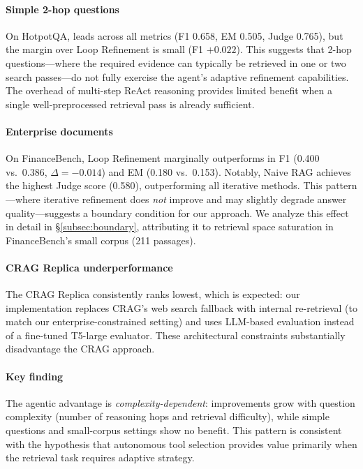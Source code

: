 \paragraph{Simple 2-hop questions}
On HotpotQA, \ours{} leads across all metrics (F1 0.658, EM 0.505, Judge 0.765), but the margin over Loop Refinement is small (F1 $+0.022$).
This suggests that 2-hop questions---where the required evidence can typically be retrieved in one or two search passes---do not fully exercise the agent's adaptive refinement capabilities.
The overhead of multi-step ReAct reasoning provides limited benefit when a single well-preprocessed retrieval pass is already sufficient.

\paragraph{Enterprise documents}
On FinanceBench, Loop Refinement marginally outperforms \ours{} in F1 (0.400 vs.\ 0.386, $\Delta = -0.014$) and EM (0.180 vs.\ 0.153).
Notably, Naive RAG achieves the highest Judge score (0.580), outperforming all iterative methods.
This pattern---where iterative refinement does \emph{not} improve and may slightly degrade answer quality---suggests a boundary condition for our approach.
We analyze this effect in detail in \S\ref{subsec:boundary}, attributing it to retrieval space saturation in FinanceBench's small corpus (211 passages).

\paragraph{CRAG Replica underperformance}
The CRAG Replica consistently ranks lowest, which is expected: our implementation replaces CRAG's web search fallback with internal re-retrieval (to match our enterprise-constrained setting) and uses LLM-based evaluation instead of a fine-tuned T5-large evaluator.
These architectural constraints substantially disadvantage the CRAG approach.

\paragraph{Key finding}
The agentic advantage is \emph{complexity-dependent}: improvements grow with question complexity (number of reasoning hops and retrieval difficulty), while simple questions and small-corpus settings show no benefit.
This pattern is consistent with the hypothesis that autonomous tool selection provides value primarily when the retrieval task requires adaptive strategy.

